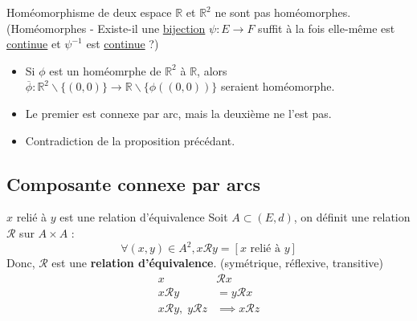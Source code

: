 \begin{Example}{Homéomorphisme de deux espace}{}
$\mathbb{R} $ et $\mathbb{R} ^{2}$ ne sont pas homéomorphes. (Homéomorphes - Existe-il une \underline{bijection} $\psi:E\to F$ suffit à la fois elle-même est \underline{continue} et $\psi^{-1}$ est \underline{continue} ?)
\end{Example}

\begin{myproof}
  \begin{itemize}

      \item Si $\phi$ est un homéomrphe de  $\mathbb{R} ^{2}$ à $\mathbb{R}$, alors $\overline{\phi}: \mathbb{R} ^{2}\backslash \{(0,0)\} \to \mathbb{R} \backslash \{\phi((0,0))\}$ seraient homéomorphe. 

      \item Le premier est connexe par arc, mais la deuxième ne l'est pas. 

      \item Contradiction de la proposition précédant.

  \end{itemize}
\end{myproof}


\subsection{Composante connexe par arcs} %
\label{sub:Composante connexe par arcs}

\begin{Prop}{$x$ relié à $y$ est une relation d'équivalence}{}
Soit $A \subset (E,d)$, on définit une relation $\mathcal{R}$ sur $A \times  A$ :
\[
    \forall (x,y) \in A^2, x \mathcal{R}  y = [x \text{ relié à } y]
\]
Donc, $\mathcal{R} $ est une \textbf{relation d'équivalence}. (symétrique, réflexive, transitive)
\begin{align*}
    x &\mathcal{R}  x \\
    x \mathcal{R}  y &= y \mathcal{R}  x \\
    x \mathcal{R} y, \; y \mathcal{R} z &\implies x \mathcal{R} z
\end{align*}
\end{Prop}

